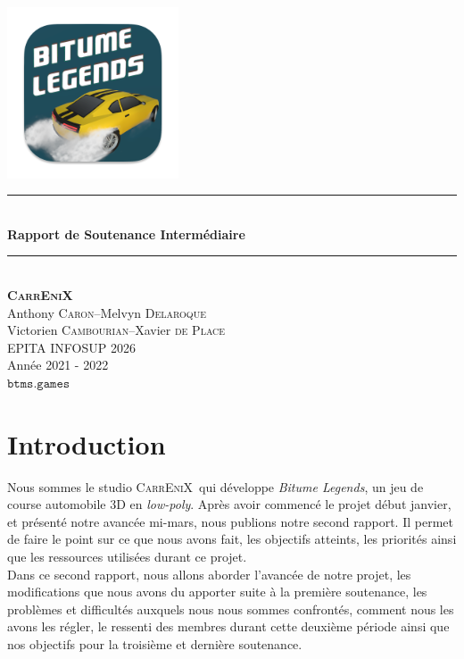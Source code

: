 \documentclass[12pt,a4paper]{article}
\newcommand{\btmlgs}{\textsl{Bitume Legends}}
\newcommand{\CEX}{\textsc{CarrEniX}}
\newcommand{\SITE}{\(\mathtt{btms.games}\)}
\begin{document}
    \begin{titlepage}
        \newcommand{\HRule}{\rule{\linewidth}{0.5mm}}
        \center
        \text{\LARGE Projet \btmlgs}\\[1cm]
        \includegraphics[scale=0.7]{logo192.png} \\[1cm]
        \HRule \\[0.4cm]
        { \huge \bfseries Rapport de Soutenance Intermédiaire\\[0.3cm] }
        \HRule \\[1.5cm]
        {\large \bfseries \CEX} \\[0.3cm]
        Anthony \textsc{Caron}\;--\;Melvyn \textsc{Delaroque}\\
        Victorien \textsc{Cambourian}\;--\;Xavier \textsc{de Place}
        \\ [4.5cm]
        EPITA INFOSUP 2026\\Année 2021 - 2022\\
        \SITE
    \end{titlepage}

    \tableofcontents
    \clearpage

    \section*{Introduction}
        Nous sommes le studio \CEX\, qui développe \btmlgs, un jeu de course automobile 3D en
        \textit{low-poly}. Après avoir commencé le projet début janvier, et présenté notre avancée 
        mi-mars, nous publions notre second rapport. Il permet de faire le point sur ce que nous avons
        fait, les objectifs atteints, les priorités ainsi que les ressources utilisées durant ce 
        projet.\\
        Dans ce second rapport, nous allons aborder l'avancée de notre projet, les modifications que 
        nous avons du apporter suite à la première soutenance, les problèmes et difficultés auxquels 
        nous nous sommes confrontés, comment nous les avons les régler, le ressenti des membres durant 
        cette deuxième période ainsi que nos objectifs pour la troisième et dernière soutenance.
\end{document}
